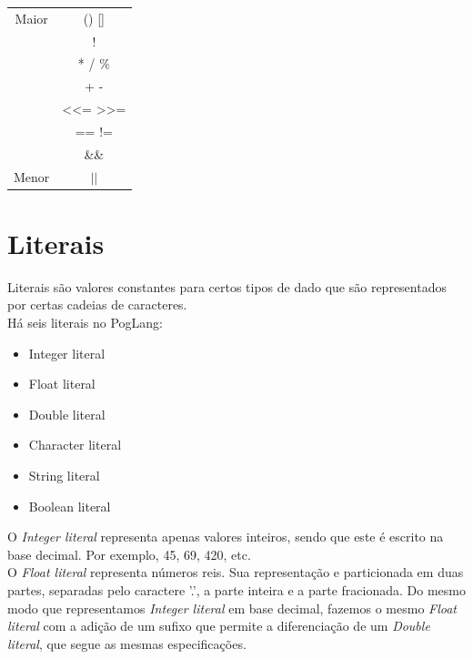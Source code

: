 \documentclass[12pt, letterpaper]{article}
\newcommand\tab[1][1cm]{\hspace*{#1}}
\newcommand\tabd[1][0.3cm]{\hspace*{#1}}
\begin{document}
\begin{spacing}{1.5}
\end{spacing}

\begin{center}
\begin{tabular}{c c}
Maior & () [] \\
 & ! \\
 & * / \% \\
 & + - \\
 & \textless \textless= \textgreater \textgreater= \\
 & == != \\
 & \&\& \\
Menor & $||$ \\
\end{tabular}
\end{center}

\begin{spacing}{1.5}
\end{spacing}

\section{Literais}

\tab Literais são valores constantes para certos tipos de dado que são representados por certas cadeias 
de caracteres.
\\[1.0mm]

\tabd Há seis literais no PogLang:

\begin{center}
        \begin{itemize}
                \item Integer literal
                \item Float literal
                \item Double literal
                \item Character literal
                \item String literal
                \item Boolean literal
        \end{itemize}
\end{center}

\begin{spacing}{1.5}
\end{spacing}

\tabd O \textit{Integer literal} representa apenas valores inteiros, sendo que este
é escrito na base decimal. Por exemplo, 45, 69, 420, etc.\\[1.0mm]
\tab O \textit{Float literal} representa números reis. Sua representação e particionada em duas partes, 
separadas pelo caractere '.', a parte inteira e a parte fracionada. Do mesmo modo que representamos
\textit{Integer literal} em base decimal, fazemos o mesmo \textit{Float literal} com a adição de um sufixo que 
permite a diferenciação de um \textit{Double literal}, que segue as mesmas especificações.
\end{document}
